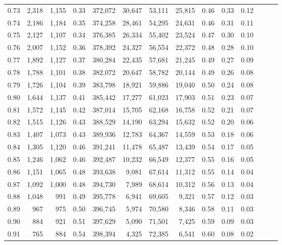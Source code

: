 \begin{tabular}{rrrrrrrrrrrrrr}
0.73 &  2,318 &  1,155 &  0.33 &  372,072 &   30,647 &  53,111 &  25,815 &  0.46 &  0.33 &      0.12 \\
0.74 &  2,186 &  1,184 &  0.35 &  374,258 &   28,461 &  54,295 &  24,631 &  0.46 &  0.31 &      0.11 \\
0.75 &  2,127 &  1,107 &  0.34 &  376,385 &   26,334 &  55,402 &  23,524 &  0.47 &  0.30 &      0.10 \\
0.76 &  2,007 &  1,152 &  0.36 &  378,392 &   24,327 &  56,554 &  22,372 &  0.48 &  0.28 &      0.10 \\
0.77 &  1,892 &  1,127 &  0.37 &  380,284 &   22,435 &  57,681 &  21,245 &  0.49 &  0.27 &      0.09 \\
0.78 &  1,788 &  1,101 &  0.38 &  382,072 &   20,647 &  58,782 &  20,144 &  0.49 &  0.26 &      0.08 \\
0.79 &  1,726 &  1,104 &  0.39 &  383,798 &   18,921 &  59,886 &  19,040 &  0.50 &  0.24 &      0.08 \\
0.80 &  1,644 &  1,137 &  0.41 &  385,442 &   17,277 &  61,023 &  17,903 &  0.51 &  0.23 &      0.07 \\
0.81 &  1,572 &  1,145 &  0.42 &  387,014 &   15,705 &  62,168 &  16,758 &  0.52 &  0.21 &      0.07 \\
0.82 &  1,515 &  1,126 &  0.43 &  388,529 &   14,190 &  63,294 &  15,632 &  0.52 &  0.20 &      0.06 \\
0.83 &  1,407 &  1,073 &  0.43 &  389,936 &   12,783 &  64,367 &  14,559 &  0.53 &  0.18 &      0.06 \\
0.84 &  1,305 &  1,120 &  0.46 &  391,241 &   11,478 &  65,487 &  13,439 &  0.54 &  0.17 &      0.05 \\
0.85 &  1,246 &  1,062 &  0.46 &  392,487 &   10,232 &  66,549 &  12,377 &  0.55 &  0.16 &      0.05 \\
0.86 &  1,151 &  1,065 &  0.48 &  393,638 &    9,081 &  67,614 &  11,312 &  0.55 &  0.14 &      0.04 \\
0.87 &  1,092 &  1,000 &  0.48 &  394,730 &    7,989 &  68,614 &  10,312 &  0.56 &  0.13 &      0.04 \\
0.88 &  1,048 &    991 &  0.49 &  395,778 &    6,941 &  69,605 &   9,321 &  0.57 &  0.12 &      0.03 \\
0.89 &    967 &    975 &  0.50 &  396,745 &    5,974 &  70,580 &   8,346 &  0.58 &  0.11 &      0.03 \\
0.90 &    884 &    921 &  0.51 &  397,629 &    5,090 &  71,501 &   7,425 &  0.59 &  0.09 &      0.03 \\
0.91 &    765 &    884 &  0.54 &  398,394 &    4,325 &  72,385 &   6,541 &  0.60 &  0.08 &      0.02 \\

\end{tabular}
